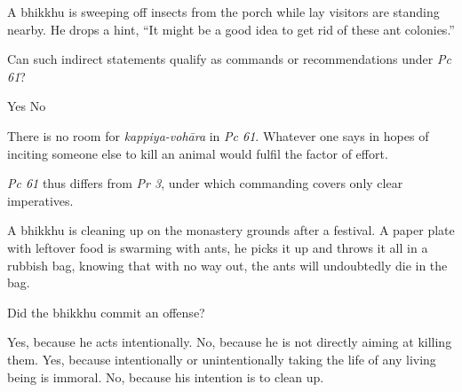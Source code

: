 \begin{exam}{\autoExamName}
\begin{problem}
\end{problem}

\problemDivide

\begin{problem}
  A bhikkhu is sweeping off insects from the porch while lay visitors are standing nearby.
  He drops a hint, ``It might be a good idea to get rid of these ant colonies.''

  Can such indirect statements qualify as commands or recommendations under \emph{Pc 61}?

  \bigskip

  \begin{answers}{2}
    \bChoices
     Yes\eAns
     No\eAns
    \eChoices
  \end{answers}

  \begin{solution}
    There is no room for \emph{kappiya-vohāra} in \emph{Pc 61}. Whatever one says in hopes of inciting someone else to kill an animal would fulfil the factor of effort.

    \emph{Pc 61} thus differs from \emph{Pr 3}, under which commanding covers only clear imperatives.
  \end{solution}

\end{problem}

\ifnosolutions
\clearpage
\fi

\begin{problem}

  A bhikkhu is cleaning up on the monastery grounds after a festival.
  A paper plate with leftover food is swarming with ants, he picks it up and throws it all in a rubbish bag,
  knowing that with no way out, the ants will undoubtedly die in the bag.

  Did the bhikkhu commit an offense?

\bigskip

\begin{manswers}{1}
    \bChoices
     Yes, because he acts intentionally. \eAns
     No, because he is not directly aiming at killing them. \eAns
     Yes, because intentionally or unintentionally taking the life of any living being is immoral. \eAns
     No, because his intention is to clean up. \eAns
    \eChoices
\end{manswers}

\end{problem}

\problemDivide


\end{exam}

